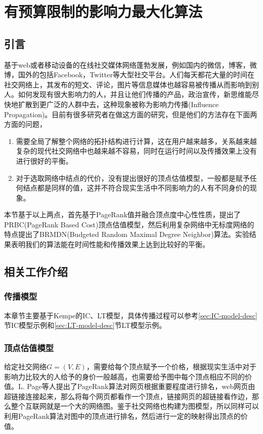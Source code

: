 

\chapter{有预算限制的影响力最大化算法}
\label{cha:3thChap03}

\section{引言}
基于web或者移动设备的在线社交媒体网络蓬勃发展，例如国内的微信，博客，微博，国外的包括Facebook，Twitter等大型社交平台。人们每天都花大量的时间在社交网络上，其发布的短文、评论，图片等信息媒体也越容易被传播从而影响到别人。如何发现有很大影响力的人，并且让他们传播的产品，政治宣传，新思维能尽快地扩散到更广泛的人群中去，这种现象被称为影响力传播(Influence Propagation)。目前有很多研究者在做这方面的研究，但是他们的方法存在下面两方面的问题，
\begin{enumerate}
\item 需要全局了解整个网络的拓扑结构进行计算，这在用户越来越多，关系越来越复杂的现代社交网络中也越来越不容易，同时在运行时间以及传播效果上没有进行很好的平衡。
\item 对于选取网络中结点的代价，没有提出很好的顶点估值模型，一般都是赋予任何结点都是同样的值，这并不符合现实生活中不同影响力的人有不同身价的现象。
\end{enumerate}
本节基于以上两点，首先基于PageRank值并融合顶点度中心性性质，提出了PRBC(PageRank Based Cost)顶点估值模型，然后利用复杂网络中无标度网络的特点提出了BRMDN(Budgeted Random Maximal Degree Neighbor)算法。实验结果表明我们的算法能在时间性能和传播效果上达到比较好的平衡。


\section{相关工作介绍}
\subsection{传播模型}
本章节主要基于Kempe\cite{kempe2003maximizing}的IC、LT模型，具体传播过程可以参考\ref{sec:IC-model-desc}节IC模型示例和\ref{sec:LT-model-desc}节LT模型示例。


\subsection{顶点估值模型}
\label{sec:chap3:cost-model}
给定社交网络$G=(V, E)$，需要给每个顶点赋予一个价格，根据现实生活中对于影响力比较大的人给予的身价一般越高，也需要给予图中每个顶点相应不同的价值。L. Page\cite{page1999pagerank}等人提出了PageRank算法对网页根据重要程度进行排名，web网页由超链接连接起来，那么将每个网页都看作一个顶点，链接网页的超链接看作边，那么整个互联网就是一个大的网络图。鉴于社交网络也构建为图模型，所以同样可以利用PageRank算法对图中的顶点进行排名，然后进行一定的映射得出顶点的价值。


